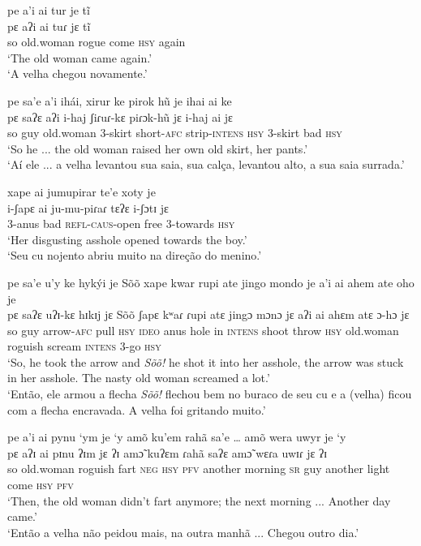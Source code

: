 \documentclass[output=paper,
modfonts,nonflat
]{langsci/langscibook}
\begin{document}
\largerpage[2]
\ea pe a'i ai tur je tĩ \\[.3em]
\gll pɛ aʔi ai tuɾ jɛ tĩ \\
so old.woman rogue come \textsc{hsy} again \\
\glt ‘The old woman came again.’ \\
‘A velha chegou novamente.’ \\
\z
\newpage 

\ea pe sa'e a'i ihái, xirur ke pirok hũ je ihai ai ke  \\[.3em]
\gll pɛ saʔɛ aʔi i-haj ʃiɾuɾ-kɛ piɾɔk-hũ jɛ i-haj ai jɛ  \\
so guy old.woman 3-skirt short-\textsc{afc} strip-\textsc{intens} \textsc{hsy} 3-skirt bad \textsc{hsy} \\
\glt ‘So he ... the old woman raised her own old skirt, her pants.’ \\
‘Aí ele ... a velha levantou sua saia, sua calça, levantou alto, a sua saia surrada.’ \\
\z

\ea xape ai jumupirar te’e xoty je \\[.3em]
\gll i-ʃapɛ ai ju-mu-piɾaɾ tɛʔɛ i-ʃɔtɪ jɛ \\
3-anus bad \textsc{refl}-\textsc{caus}-open free 3-towards \textsc{hsy} \\
\glt ‘Her disgusting asshole opened towards the boy.’ \\
‘Seu cu nojento abriu muito na direção do menino.’ \\
\z

\ea pe sa'e u'y ke hykýi je Sõõ xape kwar rupi ate jingo mondo je a'i ai ahem ate oho je  \\[.3em]
\gll pɛ saʔɛ uʔɪ-kɛ hɪkɪj jɛ Sõõ ʃapɛ kʷaɾ ɾupi atɛ jingɔ mɔnɔ jɛ aʔi ai ahɛm atɛ ɔ-hɔ jɛ  \\
so guy arrow-\textsc{afc} pull \textsc{hsy} \textsc{ideo} anus hole in \textsc{intens} shoot throw \textsc{hsy} old.woman roguish scream \textsc{intens} 3-go \textsc{hsy} \\
\glt ‘So, he took the arrow and \textit{Sõõ!} he shot it into her asshole, the arrow was stuck in her asshole. The nasty old woman screamed a lot.’ \\
‘Então, ele armou a flecha \textit{Sõõ!} flechou bem no buraco de seu cu e a (velha) ficou com a flecha encravada. A velha foi gritando muito.’ \\
\z

\ea pe a'i ai pynu ‘ym je ‘y amõ ku'em rahã sa’e … amõ wera uwyr je ‘y \\
\gll pɛ aʔɪ ai pɪnu ʔɪm jɛ ʔɪ amɔ̃ kuʔɛm ɾahã saʔɛ amɔ̃ wɛɾa uwɪɾ jɛ ʔɪ \\
so old.woman roguish fart \textsc{neg} \textsc{hsy} \textsc{pfv} another morning \textsc{sr} guy another light come \textsc{hsy} \textsc{pfv} \\
\glt ‘Then, the old woman didn’t fart anymore; the next morning ... Another day came.’ \\
‘Então a velha não peidou mais, na outra manhã ... Chegou outro dia.’ \\
\z
\end{document}
